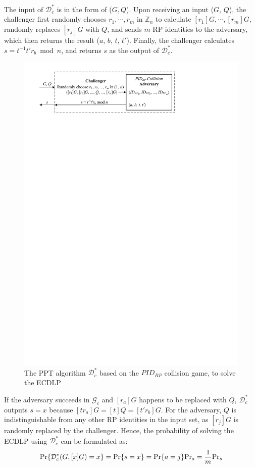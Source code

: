 The input of $\mathcal{D}^*_c$ is in the form of ($G, Q$).
Upon receiving an input ($G$, $Q$), the challenger first randomly chooses $r_1, \cdots, r_m$ in $\mathbb{Z}_n$ to calculate $[r_1]G, \cdots, [r_m]G$, randomly replaces $[r_j]G$ with $Q$, and sends $m$ RP identities to the adversary, which then returns the result ($a$, $b$, $t$, $t'$).
Finally, the challenger calculates $s = t^{-1}t'r_b \bmod n$, and returns $s$ as the output of $\mathcal{D}^*_c$.

\begin{figure}[tb]
  \centering
  \includegraphics[width=0.97\linewidth]{fig/ecdlp_algorithm.pdf}
  \caption{The PPT algorithm $\mathcal{D}^*_c$ based on the $PID_{RP}$ collision game, to solve the ECDLP}
  \label{fig:ecdlp_algorithm}
\end{figure}

If the adversary succeeds in $\mathcal{G}_c$ and $[r_a]G$ happens to be replaced with $Q$,
 $\mathcal{D}^*_c$ outputs $s=x$ because $[tr_a]G = [t]Q = [t'r_b]G$. For the adversary, $Q$ is indistinguishable from any other RP identities in the input set, as $[r_j]G$ is randomly replaced by the challenger.
Hence, the probability of solving the ECDLP using $\mathcal{D}^*_c$ can be formulated as:
\begin{equation*}
{\rm Pr}\{\mathcal{D}^*_c(G, [x]G)=x\} = {\rm Pr}\{s = x\}={\rm Pr}\{a=j\}{\rm Pr}_s=\frac{1}{m}{\rm Pr}_s
\end{equation*}

